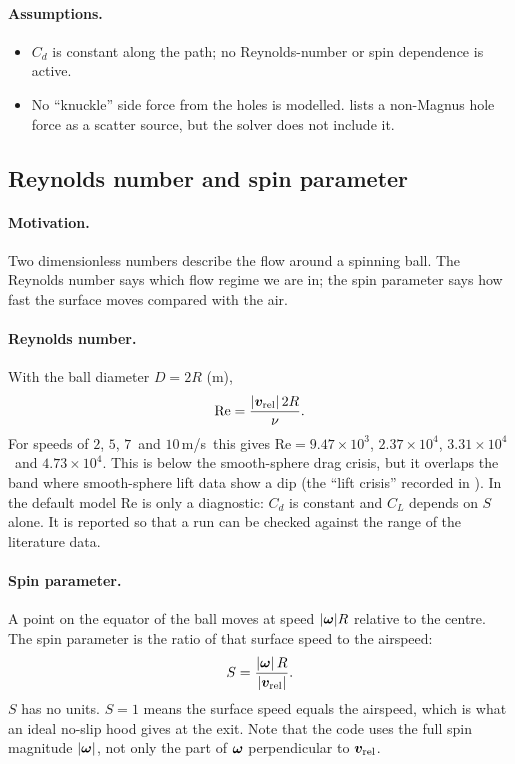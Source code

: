 \paragraph{Assumptions.}
\begin{itemize}
  \item $C_d$ is constant along the path; no Reynolds-number or spin dependence is active.
  \item No ``knuckle'' side force from the holes is modelled.  lists a
    non-Magnus hole force as a scatter source, but the solver does not include it.
\end{itemize}

\subsection{Reynolds number and spin parameter}
\label{sec:flight-Re-S}

\paragraph{Motivation.}
Two dimensionless numbers describe the flow around a spinning ball.
The Reynolds number says which flow regime we are in; the spin parameter says how fast the surface
moves compared with the air.

\paragraph{Reynolds number.}
With the ball diameter $D = 2R$ (\unit{m}),
\begin{equation}
  \mathrm{Re} = \frac{|\bm{v}_{\mathrm{rel}}|\,2R}{\nu}.
  \label{eq:flight-Re}
\end{equation}
For speeds of $2$\assumed, $5$\assumed, $7$\assumed\ and $10$\,\unit{m/s}\assumed\ this gives
$\mathrm{Re} = 9.47\times10^{3}$\derived, $2.37\times10^{4}$\derived, $3.31\times10^{4}$\derived\
and $4.73\times10^{4}$\derived.
This is below the smooth-sphere drag crisis, but it overlaps the band where smooth-sphere lift
data show a dip (the ``lift crisis'' recorded in \code{params\_lit.json}).
In the default model $\mathrm{Re}$ is only a diagnostic: $C_d$ is constant and $C_L$ depends on $S$ alone.
It is reported so that a run can be checked against the range of the literature data.

\paragraph{Spin parameter.}
A point on the equator of the ball moves at speed $|\bm{\omega}|R$ relative to the centre.
The spin parameter is the ratio of that surface speed to the airspeed:
\begin{equation}
  S = \frac{|\bm{\omega}|\,R}{|\bm{v}_{\mathrm{rel}}|}.
  \label{eq:flight-S}
\end{equation}
$S$ has no units.
$S = 1$ means the surface speed equals the airspeed, which is what an ideal no-slip hood gives at the exit.
Note that the code uses the full spin magnitude $|\bm{\omega}|$, not only the part of $\bm{\omega}$
perpendicular to $\bm{v}_{\mathrm{rel}}$.

